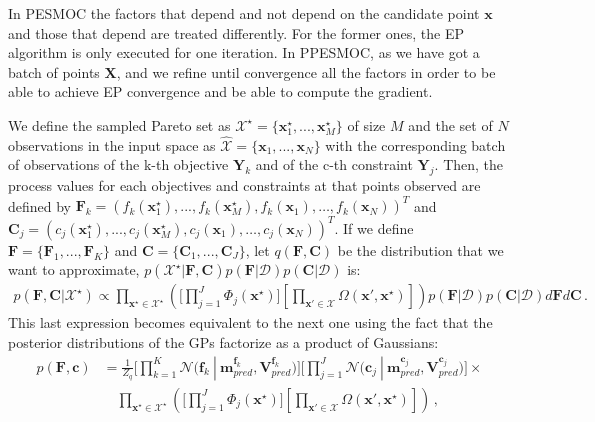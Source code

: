 In PESMOC the factors that depend and not depend on the candidate point $\mathbf{x}$ and those that depend are treated differently. For the former ones, the EP algorithm is only executed for one iteration. In PPESMOC, as we have got a batch of points $\mathbf{X}$, and we refine until convergence all the factors in order to be able to achieve EP convergence and be able to compute the gradient. 

We define the sampled Pareto set as $\mathcal{X}^\star = \{\boldsymbol{x}^\star_{1},...,\boldsymbol{x}^\star_{M}\}$ of size $M$ and the set of $N$ observations in the input space as $\hat{\mathcal{X}} = \{\boldsymbol{x}_1,...,\boldsymbol{x}_N\}$ with the corresponding batch of observations of the k-th objective $\boldsymbol{Y}_k$ and of the c-th constraint $\boldsymbol{Y}_j$. Then, the process values for each objectives and constraints at that points observed are defined by $\boldsymbol{F}_k = ( f_k(\boldsymbol{x}^{\star}_1), ... , f_k(\boldsymbol{x}^{\star}_M), f_k(\boldsymbol{x}_1),  \ldots,f_k(\boldsymbol{x}_N))^T$ and $\boldsymbol{C}_j = ( c_j(\boldsymbol{x}^{\star}_1), ... , c_j(\boldsymbol{x}^{\star}_M), c_j(\boldsymbol{x}_1), \ldots,c_j(\boldsymbol{x}_N))^T$. If we define $\boldsymbol{F} = \{\boldsymbol{F}_1,...,\boldsymbol{F}_K\}$ and $\boldsymbol{C} = \{\boldsymbol{C}_1,...,\boldsymbol{C}_J\}$, let $q(\boldsymbol{F},\boldsymbol{C})$ be the distribution that we want to approximate, $p(\mathcal{X}^{\star}|\textbf{F},\textbf{C}) p(\textbf{F}|\mathcal{D}) p(\textbf{C}|\mathcal{D})$ is:
\begin{align}
p(\boldsymbol{F},\boldsymbol{C}|\mathcal{X}^\star) \propto \prod_{\textbf{x}^\star\in \mathcal{X}^\star} 
        \left(
        \Bigg[\prod_{j=1}^{J}\Phi_j(\textbf{x}^{\star})\Bigg]
        \left[ 
        \prod_{\textbf{x}'\in \mathcal{X}} 
        \Omega(\textbf{x}',\textbf{x}^{\star})
        \right] 
        \right)
p(\textbf{F}|\mathcal{D}) p(\textbf{C}|\mathcal{D})
 d\textbf{F} d\textbf{C}\,.
\end{align}
This last expression becomes equivalent to the next one using 
the fact that the posterior distributions of the GPs factorize
as a product of Gaussians:
\begin{align}
p(\boldsymbol{F},\boldsymbol{c}) & = \frac{1}{Z_q} \bigg[\prod_{k=1}^{K}\mathcal{N}\big(\boldsymbol{f}_k\ |\  \boldsymbol{m}_{pred}^{\boldsymbol{f}_k}, \boldsymbol{V}_{pred}^{\boldsymbol{f}_k}\big)\bigg] \bigg[\prod_{j=1}^{J}\mathcal{N}\big(\boldsymbol{c}_j\ |\  \boldsymbol{m}_{pred}^{\boldsymbol{c}_j}, \boldsymbol{V}_{pred}^{\boldsymbol{c}_j}\big)\bigg] \times \nonumber
\\
        & \quad \prod_{\textbf{x}^\star\in \mathcal{X}^\star} 
        \left(
        \Bigg[\prod_{j=1}^{J}\Phi_j(\textbf{x}^{\star})\Bigg]
        \left[ 
        \prod_{\textbf{x}'\in \mathcal{X}} 
        \Omega(\textbf{x}',\textbf{x}^{\star})
        \right] 
        \right)\,,
	\label{eq:target}
\end{align}

